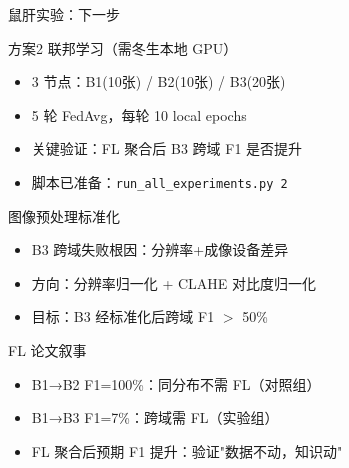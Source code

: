 \documentclass[aspectratio=169, 10pt]{beamer}
\begin{document}
\begin{frame}{鼠肝实验：下一步}
  \begin{block}{方案2 联邦学习（需冬生本地 GPU）}
    \begin{itemize}
      \item 3 节点：B1(10张) / B2(10张) / B3(20张)
      \item 5 轮 FedAvg，每轮 10 local epochs
      \item 关键验证：FL 聚合后 B3 跨域 F1 是否提升
      \item 脚本已准备：\texttt{run\_all\_experiments.py 2}
    \end{itemize}
  \end{block}
  \vspace{0em}
  \begin{block}{图像预处理标准化}
    \begin{itemize}
      \item B3 跨域失败根因：分辨率+成像设备差异
      \item 方向：分辨率归一化 + CLAHE 对比度归一化
      \item 目标：B3 经标准化后跨域 F1 $>$ 50\%
    \end{itemize}
  \end{block}
  \vspace{0em}
  \begin{alertblock}{FL 论文叙事}
    \begin{itemize}
      \item B1→B2 F1=100\%：同分布不需 FL（对照组）
      \item B1→B3 F1=7\%：跨域需 FL（实验组）
      \item FL 聚合后预期 F1 提升：验证"数据不动，知识动"
    \end{itemize}
  \end{alertblock}
\end{frame}
\end{document}
